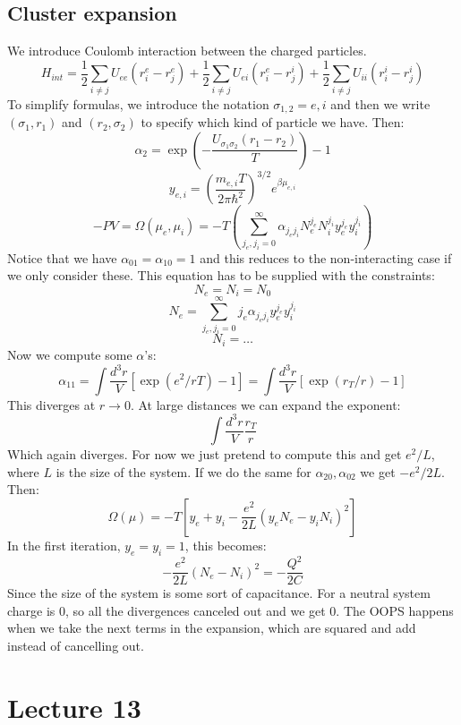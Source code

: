 \documentclass[12 pt]{article}
\begin{document}
\subsection*{Cluster expansion}
We introduce Coulomb interaction between the charged particles.
\[     H_{int} = \frac{1}{2} \sum_{i\neq j} U_{ee} (r_i^e - r_j^e)  +  \frac{1}{2} \sum_{i\neq j} U_{ei} (r_i^e - r_j^i) + \frac{1}{2} \sum_{i\neq j} U_{ii} (r_i^i - r_j^i)    \]
To simplify formulas, we introduce the notation $\sigma_{1,2} = e,i$ and then we write $(\sigma_1, r_1)$ and $(r_2, \sigma_2)$ to specify which kind of particle we have. Then:
\[       \alpha_2 = \exp \left( - \frac{U_{\sigma_1 \sigma_2} (r_1 - r_2)}{T}  \right) - 1     \]
\[    y_{e,i} = \left( \frac{m_{e,i} T}{2\pi \hbar^2}\right)^{3/2}  e^{\beta \mu_{e,i}}   \]
\[    - PV = \Omega(\mu_e, \mu_i) = - T \left( \sum_{j_e, j_i = 0}^{\infty} \alpha_{j_ej_i} N_e^{j_e} N_i^{j_i} y_e^{j_e} y_i^{j_i}  \right)    \]
Notice that we have $\alpha_{01} = \alpha_{10} =1$ and this reduces to the non-interacting case if we only consider these. This equation has to be supplied with the constraints:
\[       N_e = N_i = N_0    \]
\[     N_e = \sum_{j_e, j_i = 0}^{\infty} j_e \alpha_{j_ej_i}  y_e^{j_e} y_i^{j_i}      \]
\[    N_i = \dots    \]
Now we compute some $\alpha$'s:
\[       \alpha_{11} = \int \frac{d^3 r}{V} \left[ \exp(e^2/r T) - 1  \right]   =  \int \frac{d^3 r}{V} \left[ \exp(r_T/r) - 1  \right]   \]
This diverges at $r\to 0$. At large distances we can expand the exponent:
\[     \int \frac{d^3 r}{V} \frac{r_T}{r}    \]
Which again diverges. For now we just pretend to compute this and get $e^2/L$, where $L$ is the size of the system. If we do the same for $\alpha_{20}, \alpha_{02}$ we get $- e^2/2L$. Then:
\[       \Omega(\mu) = - T \left[ y_e + y_i - \frac{e^2}{2L} (y_e N_e - y_i N_i)^2  \right]      \]
In the first iteration, $y_e = y_i = 1$, this becomes:
\[     - \frac{e^2}{2L} (N_e - N_i)^2 = - \frac{Q^2}{2C}  \]
Since the size of the system is some sort of capacitance. For a neutral system charge is 0, so all the divergences canceled out and we get 0. The OOPS happens when we take the next terms in the expansion, which are squared and add instead of cancelling out.


\section*{Lecture 13}
\end{document}
